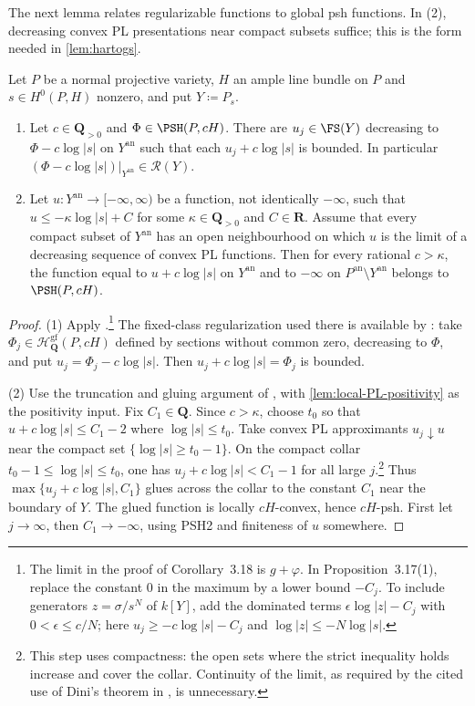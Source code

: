 \documentclass[11pt,a4paper]{article}
\newcommand{\an}{\mathrm{an}}          %
\begin{document}
The next lemma relates regularizable functions to global psh functions. In (2), decreasing convex PL presentations near compact subsets suffice; this is the form needed in \cref{lem:hartogs}.

\begin{lemma}\label{lem:compactification}
Let $P$ be a normal projective variety, $H$ an ample line bundle on $P$ and $s\in H^0(P,H)$ nonzero, and put $Y\coloneqq P_s$.
\begin{enumerate}
\item Let $c\in\mathbf Q_{>0}$ and $\Phi\in\PSH(P,cH)$. There are $u_j\in\FS(Y)$ decreasing to $\Phi-c\log|s|$ on $Y^{\an}$ such that each $u_j+c\log|s|$ is bounded. In particular $(\Phi-c\log|s|)|_{Y^{\an}}\in\mathcal{R}(Y)$.
\item Let $u\colon Y^{\an}\to[-\infty,\infty)$ be a function, not identically $-\infty$, such that $u\le-\kappa\log|s|+C$ for some $\kappa\in\mathbf Q_{>0}$ and $C\in\mathbf R$. Assume that every compact subset of $Y^{\an}$ has an open neighbourhood on which $u$ is the limit of a decreasing sequence of convex PL functions. Then for every rational $c>\kappa$, the function equal to $u+c\log|s|$ on $Y^{\an}$ and to $-\infty$ on $P^{\an}\setminus Y^{\an}$ belongs to $\PSH(P,cH)$.
\end{enumerate}
\end{lemma}

\begin{proof}
(1) Apply \cite[Corollary~3.18 and Proposition~3.17(1)]{Wu26}.\footnote{The limit in the proof of Corollary~3.18 is $g+\varphi$. In Proposition~3.17(1), replace the constant $0$ in the maximum by a lower bound $-C_j$. To include generators $z=\sigma/s^N$ of $k[Y]$, add the dominated terms $\epsilon\log|z|-C_j$ with $0<\epsilon\le c/N$; here $u_j\ge-c\log|s|-C_j$ and $\log|z|\le-N\log|s|$.} The fixed-class regularization used there is available by \cite[Corollary~12.18(iii) and Example~3.9]{BJ22}: take $\Phi_j\in\mathcal{H}^{\mathrm{gf}}_{\mathbf{Q}}(P,cH)$ defined by sections without common zero, decreasing to $\Phi$, and put $u_j=\Phi_j-c\log|s|$. Then $u_j+c\log|s|=\Phi_j$ is bounded.

(2) Use the truncation and gluing argument of \cite[Lemmas~3.25(1) and~3.26]{Wu26}, with \cref{lem:local-PL-positivity} as the positivity input. Fix $C_1\in\mathbf Q$. Since $c>\kappa$, choose $t_0$ so that $u+c\log|s|\le C_1-2$ where $\log|s|\le t_0$. Take convex PL approximants $u_j\downarrow u$ near the compact set $\{\log|s|\ge t_0-1\}$. On the compact collar $t_0-1\le\log|s|\le t_0$, one has $u_j+c\log|s|<C_1-1$ for all large $j$.\footnote{This step uses compactness: the open sets where the strict inequality holds increase and cover the collar. Continuity of the limit, as required by the cited use of Dini's theorem in \cite[Lemma~3.25(1)]{Wu26}, is unnecessary.} Thus $\max\{u_j+c\log|s|,C_1\}$ glues across the collar to the constant $C_1$ near the boundary of $Y$. The glued function is locally $cH$-convex, hence $cH$-psh. First let $j\to\infty$, then $C_1\to-\infty$, using PSH2 and finiteness of $u$ somewhere.
\end{proof}
\end{document}

